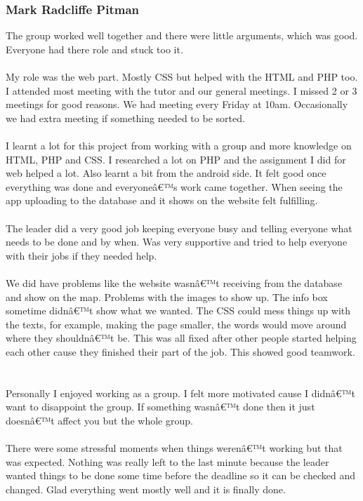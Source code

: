 \documentclass[12pt]{article}
\begin{document}
\subsubsection{Mark Radcliffe Pitman}
The group worked well together and there were little arguments, which was good. Everyone had there role and stuck too it. ~\\\\
My role was the web part. Mostly CSS but helped with the HTML and PHP too. I attended most meeting with the tutor and our general meetings. I missed 2 or 3 meetings for good reasons.  We had meeting every Friday at 10am. Occasionally we had extra meeting if something needed to be sorted. ~\\\\
I learnt a lot for this project from working with a group and more knowledge on HTML, PHP and CSS. I researched a lot on PHP and the assignment I did for web helped a lot. Also learnt a bit from the android side. It felt good once everything was done and everyoneâ€™s work came together. When seeing the app uploading to the database and it shows on the website felt fulfilling.  ~\\\\
The leader did a very good job keeping everyone busy and telling everyone what needs to be done and by when. Was very supportive and tried to help everyone with their jobs if they needed help.~\\\\
We did have problems like the website wasnâ€™t receiving from the database and show on the map. Problems with the images to show up. The info box sometime didnâ€™t show what we wanted. The CSS could mess things up with the texts, for example, making the page smaller, the words would move around where they shouldnâ€™t be. This was all fixed after other people started helping each other cause they finished their part of the job. This showed good teamwork. ~\\\\
Personally I enjoyed working as a group. I felt more motivated cause I didnâ€™t want to disappoint the group. If something wasnâ€™t done then it just doesnâ€™t affect you but the whole group.~\\\\
 There were some stressful moments when things werenâ€™t working but that was expected. Nothing was really left to the last minute because the leader wanted things to be done some time before the deadline so it can be checked and changed. Glad everything went mostly well and it
is finally done.
\end{document}
